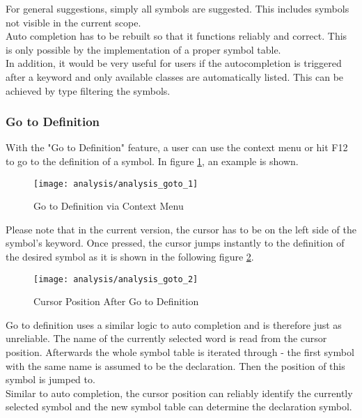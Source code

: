 For general suggestions, simply all symbols are suggested.
This includes symbols not visible in the current scope. \\

Auto completion has to be rebuilt so that it functions reliably and correct.
This is only possible by the implementation of a proper symbol table.\\

In addition, it would be very useful for users if the autocompletion is triggered after a 
keyword and only available classes are automatically listed. This can be achieved by type filtering the symbols.

\subsubsection{Go to Definition}
With the "Go to Definition" feature, a user can use the context menu or hit F12 to go to the definition of a symbol.
In figure \ref{fig:analysis_goto_1}, an example is shown.

\begin{figure}[H]
    \centering
    \texttt{[image: analysis/analysis\_goto\_1]}
    \caption{Go to Definition via Context Menu}
    \label{fig:analysis_goto_1}
\end{figure}

Please note that in the current version, the cursor has to be on the left side of the symbol's keyword.
Once pressed, the cursor jumps instantly to the definition of the desired symbol as it is shown in the following figure \ref{fig:analysis_goto_2}.

\begin{figure}[H]
    \centering
    \texttt{[image: analysis/analysis\_goto\_2]}
    \caption{Cursor Position After Go to Definition}
    \label{fig:analysis_goto_2}
\end{figure}

Go to definition uses a similar logic to auto completion and is therefore just as unreliable.
The name of the currently selected word is read from the cursor position.
Afterwards the whole symbol table is iterated through - the first symbol with the same name is assumed to be the declaration.
Then the position of this symbol is jumped to. \\

Similar to auto completion, the cursor position can reliably identify the currently selected symbol and the new symbol table can determine the declaration symbol.


